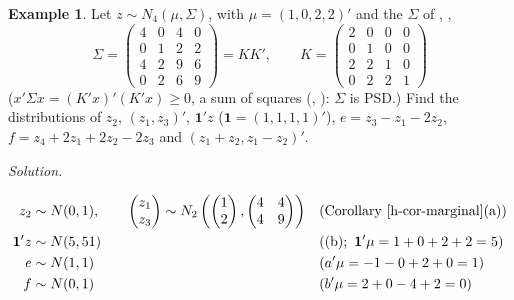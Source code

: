 \documentclass[12pt]{article}
\newcommand{\one}{\mathbf 1}
\theoremstyle{definition}
\newtheorem{example}[theorem]{Example}
\newcommand{\boardtop}{\vspace*{-\abovedisplayskip}}
\begin{document}
\begin{example}\label{h-exm-marginal}
Let \(z\sim N_4(\mu,\Sigma)\), with \(\mu=(1,0,2,2)'\) and the \(\Sigma\) of , ,
\[
\Sigma=\begin{pmatrix}4&0&4&0\\0&1&2&2\\4&2&9&6\\0&2&6&9\end{pmatrix}=KK',\qquad
K=\begin{pmatrix}2&0&0&0\\0&1&0&0\\2&2&1&0\\0&2&2&1\end{pmatrix}
\]
(\(x'\Sigma x=(K'x)'(K'x)\geqslant0\), a sum of squares (, ): \(\Sigma\) is PSD.) Find the
distributions of \(z_2\), \((z_1,z_3)'\), \(\one'z\) (\(\one=(1,1,1,1)'\)), \(e=z_3-z_1-2z_2\), \(f=z_4+2z_1+2z_2-2z_3\) and
\((z_1+z_2,z_1-z_2)'\).
\end{example}
\textit{Solution.}
\begin{board}[Corollary~\ref{h-cor-marginal}; \(e=a'z\), \(f=b'z\) with \(a=(-1,-2,1,0)'\), \(b=(2,2,-2,1)'\);
\(a'\Sigma a=b'\Sigma b=1\), \(\one'\Sigma\one=51\) (\lec{9}, \lit{Example~5}):]
\boardtop
\begin{align*}
z_2&\sim N(0,1),\qquad\begin{pmatrix}z_1\\z_3\end{pmatrix}\sim
N_2\left(\begin{pmatrix}1\\2\end{pmatrix},\begin{pmatrix}4&4\\4&9\end{pmatrix}\right)&&\text{(Corollary~\ref{h-cor-marginal}(a))}\\
\one'z&\sim N(5,51)&&(\text{(b)};\ \one'\mu=1+0+2+2=5)\\
e&\sim N(1,1)&&(a'\mu=-1-0+2+0=1)\\
f&\sim N(0,1)&&(b'\mu=2+0-4+2=0)
\end{align*}
\end{board}
\end{document}
